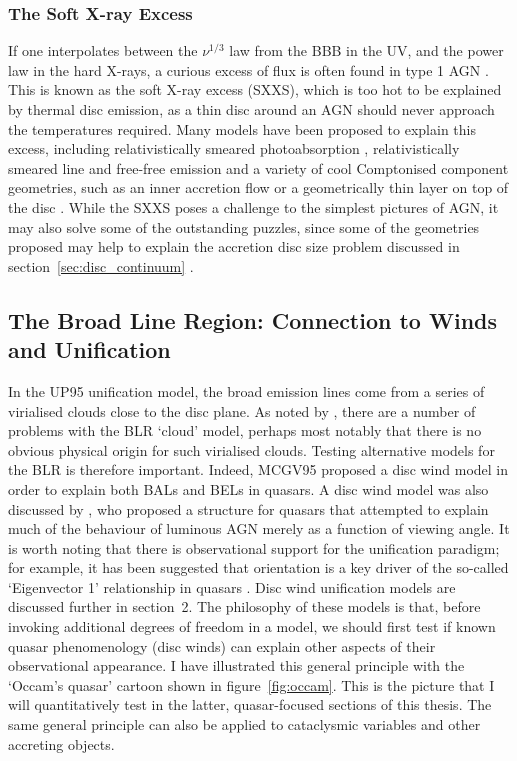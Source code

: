 \subsubsection{The Soft X-ray Excess}
\label{sec:sxxs}

If one interpolates between the $\nu^{1/3}$ law from the BBB in the UV, and the power law
in the hard X-rays, a curious excess of flux is often found
in type 1 AGN \citep[see figure~\ref{fig:quasar_sed}, and][]{koratkar1999}. 
This is known as the soft X-ray excess (SXXS), which is too 
hot to be explained by thermal disc emission, as a thin disc around an AGN should
never approach the temperatures required. Many models have been proposed to
explain this excess, including relativistically smeared 
photoabsorption \citep{gierlinskidone2004b,gierlinskidone2006}, 
relativistically smeared line and 
free-free emission \citep{rossfabian2005,crummy2006} 
and a variety of cool Comptonised component geometries, such as an 
inner accretion flow \citep{magdiarz1998,done2012} 
or a geometrically thin layer on top of the disc \citep{januik2001}. 
While the SXXS poses a challenge to
the simplest pictures of AGN, it may also solve some of the outstanding puzzles, 
since some of the geometries proposed may help to explain the 
accretion disc size problem discussed in 
section~\ref{sec:disc_continuum} \citep{gardnerdone2016}.

\subsection{The Broad Line Region: Connection to Winds and Unification}

In the UP95 unification model, the broad emission lines
come from a series of virialised clouds close to the disc plane.
As noted by \citet[][hereafter MCGV95]{MCGV95}, there are a number of problems with
the BLR `cloud' model, perhaps most notably that there is no obvious 
physical origin for such virialised clouds. 
Testing alternative models for the BLR is therefore important.
Indeed, MCGV95 proposed a disc wind model in order to explain both BALs and BELs
in quasars. A disc wind model was also  discussed by \cite{elvis2000}, 
who proposed a structure for quasars that attempted to explain much 
of the behaviour of luminous AGN
merely as a function of viewing angle. It is worth noting that
there is observational support for the unification paradigm; for example,
it has been suggested that orientation is a key driver of the so-called
`Eigenvector 1' relationship in quasars 
\citep{borosongreen,sulentic2000ev1,marziani2001,shenho2014}.
Disc wind unification models are discussed further in section~2.
The philosophy of these models is that, before invoking additional
degrees of freedom in a model, we should first test if known quasar phenomenology 
(disc winds) can explain other aspects of their observational appearance.
I have illustrated this general principle with the `Occam's quasar' 
cartoon shown in figure~\ref{fig:occam}. This is the picture that I will
quantitatively test in the latter, quasar-focused sections of this thesis.
The same general principle can also be applied to cataclysmic variables 
and other accreting objects.


